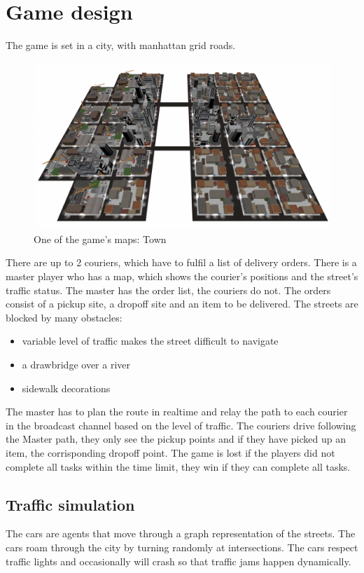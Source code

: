 \documentclass[12pt]{article}
\begin{document}
\clearpage

\section{Game design}
The game is set in a city, with manhattan grid roads.
\begin{figure}[H]
\includegraphics[width=\textwidth]{map_town}
\caption{One of the game's maps: Town}
\end{figure}
There are up to 2 couriers, which have to fulfil a list of delivery orders.
There is a master player who has a map, which shows the courier's positions and the street's traffic status. The master has the order list, the couriers do not.
The orders consist of a pickup site, a dropoff site and an item to be delivered.
The streets are blocked by many obstacles:
\begin{itemize}
  \item variable level of traffic makes the street difficult to navigate
  \item a drawbridge over a river
  \item sidewalk decorations
\end{itemize}
The master has to plan the route in realtime and relay the path to each courier in the broadcast channel based on the level of traffic.
The couriers drive following the Master path, they only see the pickup points and if they have picked up an item, the corrisponding dropoff point.
The game is lost if the players did not complete all tasks within the time limit, they win if they can complete all tasks.

\subsection{Traffic simulation}
The cars are agents that move through a graph representation of the streets. The cars roam through the city by turning randomly at intersections. The cars respect traffic lights and occasionally will crash so that traffic jams happen dynamically.
\end{document}
